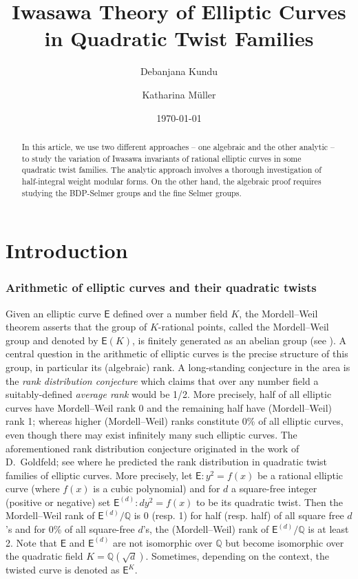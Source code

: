 \documentclass{amsart}
\title{Iwasawa Theory of Elliptic Curves in Quadratic Twist Families}
\author[D.~Kundu]{Debanjana Kundu}
\author[K.~M\"uller]{Katharina M\"uller}
\date{\today}
\numberwithin{equation}{section}
\theoremstyle{remark}
\newcommand{\Zp}{\mathbb{Z}_p}
\newcommand{\Q}{\mathbb{Q}}
\newcommand{\EC}{\mathsf{E}}
\theoremstyle{plain} %
\begin{document}
\begin{abstract}
In this article, we use two different approaches -- one algebraic and the other analytic -- to study the variation of Iwasawa invariants of rational elliptic curves in some quadratic twist families.
The analytic approach involves a thorough investigation of half-integral weight modular forms.
On the other hand, the algebraic proof requires studying the BDP-Selmer groups and the fine Selmer groups.
\end{abstract}

\keywords{quadratic twist, cyclotomic $\Zp$-extension}


\maketitle

\section{Introduction}

\subsubsection*{Arithmetic of elliptic curves and their quadratic twists}
Given an elliptic curve $\EC$ defined over a number field $K$, the Mordell--Weil theorem asserts that the group of $K$-rational points, called the Mordell--Weil group and denoted by $\EC(K)$, is finitely generated as an abelian group (see \cite{Mor22, Wei29}).
A central question in the arithmetic of elliptic curves is the precise structure of this group, in particular its (algebraic) rank.
A long-standing conjecture in the area is the \emph{rank distribution conjecture} which claims that over any number field a suitably-defined \emph{average rank} would be 1/2.
More precisely, half of all elliptic curves have Mordell--Weil rank 0 and the remaining half have (Mordell--Weil) rank 1; whereas higher (Mordell–Weil) ranks constitute 0\% of all elliptic curves, even though there may exist infinitely many such elliptic curves.
The aforementioned rank distribution conjecture originated in the work of D.~Goldfeld; see \cite{Gol79} where he predicted the rank distribution in quadratic twist families of elliptic curves.
More precisely, let $\EC: y^2 = f(x)$ be a rational elliptic curve (where $f(x)$ is a cubic polynomial) and for $d$ a square-free integer (positive or negative) set $\EC^{(d)}: dy^2 = f(x)$ to be its quadratic twist.
Then the Mordell--Weil rank of $\EC^{(d)}/\Q$ is 0 (resp. 1) for half (resp. half) of all square free $d$'s and for 0\% of all square-free $d$'s, the (Mordell--Weil) rank of $\EC^{(d)}/\Q$ is at least 2.
Note that $\EC$ and $\EC^{(d)}$ are not isomorphic over $\Q$ but become isomorphic over the quadratic field $K = \Q(\sqrt{d})$.
Sometimes, depending on the context, the twisted curve is denoted as $\EC^K$.
\end{document}
